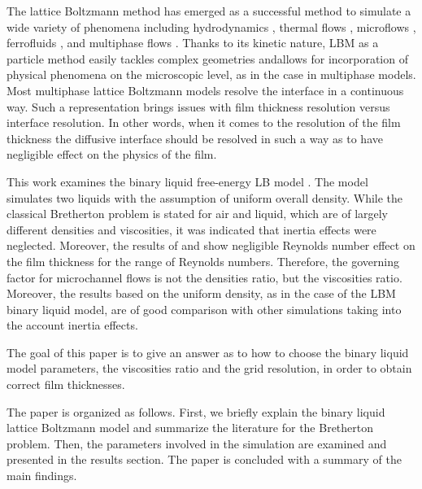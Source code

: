 \documentclass{article}
\begin{document}
The lattice Boltzmann method has emerged as a successful method to simulate
a wide variety of phenomena including hydrodynamics \cite{yu}, thermal flows
\cite{karlin-minimalmodels}, microflows \cite{ansumali-small-knudsen},
ferrofluids \cite{kuzmin-aniso}, and multiphase flows
\cite{swift,Shan-chen:extended}. Thanks to its kinetic nature, LBM as a particle
method easily tackles complex geometries andallows for incorporation of
physical phenomena on the microscopic level, as in the case in multiphase models. Most
multiphase lattice Boltzmann models \cite{swift, Shan-chen:extended} resolve
the interface in a continuous way. Such a representation
brings issues with film thickness resolution versus interface
resolution. In other words, when it comes to the resolution of the film
thickness the diffusive interface should be resolved in such a way as to have
negligible effect on the physics of the film.

This work examines the binary liquid free-energy LB model \cite{swift}. The
model simulates two liquids with the assumption of uniform overall
density. While the classical Bretherton problem is stated for air and liquid, which are of largely
different densities and viscosities, it was indicated \cite{bretherton} that inertia effects were
neglected. Moreover, the results of \citet{giavedoni-numerical} and \citet{heil-bretherton} show
negligible Reynolds number effect on the film thickness for the range of Reynolds numbers.
Therefore, the governing factor for microchannel flows is not the densities ratio, but the
viscosities ratio. Moreover, the results based on the uniform density, as in the case of the LBM
binary liquid model, are of good comparison with other simulations
\cite{giavedoni-numerical,heil-bretherton} taking into the account inertia effects. 

The goal of this paper is to give an answer as to how to choose the
binary liquid model parameters, the viscosities ratio and the grid
resolution, in order to obtain correct film thicknesses.

The paper is organized as follows.  First, we briefly
explain the binary liquid lattice Boltzmann model and summarize the literature
for the Bretherton problem. Then, the parameters involved in the
simulation are examined and presented in the results section. The paper is
concluded with a summary of the main findings.
\end{document}
